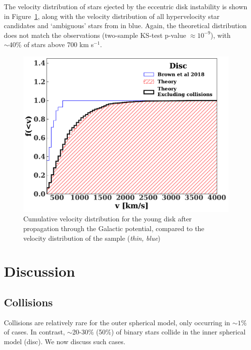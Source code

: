 \documentclass[fleqn,usenatbib]{mnras}
\begin{document}
The velocity distribution of stars ejected by the eccentric disk instability is shown in Figure~\ref{fig:diskv}, along with the velocity distribution of all hypervelocity star candidates and `ambiguous' stars from \citet{warren_brown+2018} in blue. Again, the theoretical distribution does not match the observations (two-sample KS-test p-value $\approx 10^{-9}$), with $\sim 40\%$ of stars above 700 km s$^{-1}$.

\begin{figure}
    \includegraphics[width=\columnwidth]{figures/vcomp_disk_1_tmin0.0.pdf}
    \caption{Cumulative velocity distribution for the young disk after propagation through the Galactic potential, compared to the velocity distribution of the \citet{warren_brown+2018} sample (\emph{thin, blue})
    \label{fig:diskv}}
\end{figure}



\section{Discussion}
\label{sec:disc}
\subsection{Collisions}
Collisions are relatively rare for the outer spherical model, only occurring in $\sim 1\%$ of cases. 
In contrast, $\sim$20-30\% (50\%) of binary stars collide in the inner spherical model (disc). We now discuss such cases.
\end{document}
